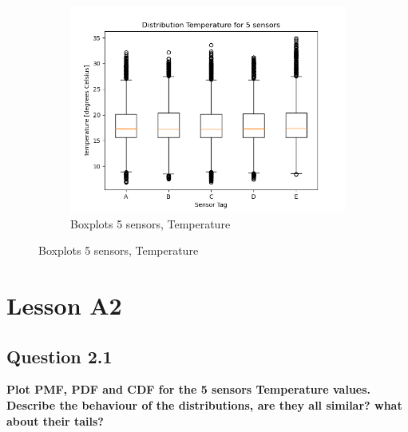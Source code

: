 \documentclass{report}
\begin{document}
\begin{figure}[H]
		\begin{subfigure}[b]{0.7\linewidth}
			\includegraphics[width=\linewidth]{GEO1001_hw01_images/GEO1001_hw01_A1_box_temp.png}
			\caption{Boxplots 5 sensors, Temperature}
			\label{fig:boxtemp}
		\end{subfigure}
	\end{figure}
	
	
	\section{Lesson A2}
	
	\subsection{Question 2.1}
	\textbf{Plot PMF, PDF and CDF for the 5 sensors Temperature values. Describe the behaviour of the distributions, are they all similar? what about their tails?}
	
\end{document}
